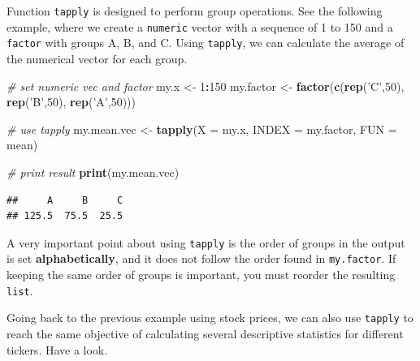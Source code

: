 \documentclass[11pt,]{book}
\newenvironment{Shaded}{\begin{snugshade}}{\end{snugshade}}
\newcommand{\KeywordTok}[1]{\textcolor[rgb]{0.27,0.27,0.27}{\textbf{#1}}}
\newcommand{\DataTypeTok}[1]{\textcolor[rgb]{0.27,0.27,0.27}{#1}}
\newcommand{\DecValTok}[1]{\textcolor[rgb]{0.06,0.06,0.06}{#1}}
\newcommand{\StringTok}[1]{\textcolor[rgb]{0.5,0.5,0.5}{#1}}
\newcommand{\CommentTok}[1]{\textcolor[rgb]{0.56,0.35,0.01}{\textit{#1}}}
\newcommand{\OperatorTok}[1]{\textcolor[rgb]{0.81,0.36,0.00}{\textbf{#1}}}
\newcommand{\NormalTok}[1]{#1}
\begin{document}
Function \texttt{tapply} is designed to perform group operations. See
the following example, where we create a \texttt{numeric} vector with a
sequence of 1 to 150 and a \texttt{factor} with groups A, B, and C.
Using \texttt{tapply}, we can calculate the average of the numerical
vector for each group. 

\begin{Shaded}
\begin{Highlighting}[]
\CommentTok{# set numeric vec and factor}
\NormalTok{my.x <-}\StringTok{ }\DecValTok{1}\OperatorTok{:}\DecValTok{150}
\NormalTok{my.factor <-}\StringTok{ }\KeywordTok{factor}\NormalTok{(}\KeywordTok{c}\NormalTok{(}\KeywordTok{rep}\NormalTok{(}\StringTok{'C'}\NormalTok{,}\DecValTok{50}\NormalTok{), }\KeywordTok{rep}\NormalTok{(}\StringTok{'B'}\NormalTok{,}\DecValTok{50}\NormalTok{), }\KeywordTok{rep}\NormalTok{(}\StringTok{'A'}\NormalTok{,}\DecValTok{50}\NormalTok{)))}

\CommentTok{# use tapply}
\NormalTok{my.mean.vec <-}\StringTok{ }\KeywordTok{tapply}\NormalTok{(}\DataTypeTok{X =}\NormalTok{ my.x, }\DataTypeTok{INDEX =}\NormalTok{ my.factor, }\DataTypeTok{FUN =}\NormalTok{ mean)}

\CommentTok{# print result}
\KeywordTok{print}\NormalTok{(my.mean.vec)}
\end{Highlighting}
\end{Shaded}

\begin{verbatim}
##     A     B     C 
## 125.5  75.5  25.5
\end{verbatim}

A very important point about using \texttt{tapply} is the order of
groups in the output is set \textbf{alphabetically}, and it does not
follow the order found in \texttt{my.factor}. If keeping the same order
of groups is important, you must reorder the resulting \texttt{list}.

Going back to the previous example using stock prices, we can also use
\texttt{tapply} to reach the same objective of calculating several
descriptive statistics for different tickers. Have a look.

\begin{Shaded}
\end{Shaded}
\end{document}
